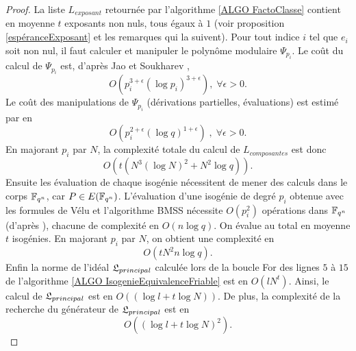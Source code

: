 \begin{proof}
	 La liste $L_{exposant}$ retournée par l'algorithme \ref{ALGO FactoClasse} contient en moyenne $t$ exposants non nuls, tous égaux à $1$ (voir proposition \ref{espéranceExposant} et les remarques qui la suivent). Pour tout indice $i$ tel que $e_{i}$ soit non nul, il faut calculer et manipuler le polynôme modulaire $\Psi_{p_{i}}$. Le coût du calcul de $\Psi_{p_{i}}$ est, d'après Jao et Soukharev \cite{JaoSoukharev},
	\begin{equation*}
		O\left( p_{i}^{3 + \epsilon}\left(\log p_{i}\right)^{3 + \epsilon} \right),\;\forall\epsilon >0.
	\end{equation*}
	Le coût des manipulations de $\Psi_{p_{i}}$ (dérivations partielles, évaluations) est estimé par \cite{JaoSoukharev} en 
	\begin{equation*}
		O\left(p_{i}^{2 + \epsilon}\left( \log q \right)^{1 + \epsilon} \right)\;,\;\forall\epsilon >0.
	\end{equation*}
	En majorant $p_{i}$ par $N$, la complexité totale du calcul de $L_{composantes}$ est donc
	\begin{equation*}
		O\left( t \left( N^3(\log N)^{2} + N^2\log q \right) \right). 
	\end{equation*}
	Ensuite les évaluation de chaque isogénie nécessitent de mener des calculs dans le corps $\mathbb{F}_{q^{n}}$, car $P\in E(\mathbb{F}_{q^{n}})$. L'évaluation d'une isogénie de degré $p_{i}$ obtenue avec les formules de Vélu et l'algorithme BMSS nécessite $O(p_{i}^{2})$ opérations dans $\mathbb{F}_{q^{n}}$ (d'après \cite{JaoSoukharev}), chacune de complexité en $O(n\log q)$. On évalue au total en moyenne $t$ isogénies. En majorant $p_{i}$ par $N$, on obtient une complexité en 
	\begin{equation*}
		O(tN^2n\log q). 
	\end{equation*}
	Enfin la norme de l'idéal $\mathfrak{L}_{principal}$ calculée lors de la boucle For des lignes $5$ à $15$ de l'algorithme \ref{ALGO IsogenieEquivalenceFriable} est en $O(lN^t)$. Ainsi, le calcul de $\mathfrak{L}_{principal}$ est en $O\left( \left( \log l + t\log N\right) \right)$. De plus, la complexité de la recherche du générateur de $\mathfrak{L}_{principal}$ est en 
	\begin{equation*}
		O\left( \left( \log l + t\log N\right)^{2} \right). 
	\end{equation*}
\end{proof}



